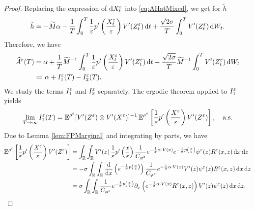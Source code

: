\documentclass[10pt]{article}
\begin{document}
\begin{proof} Replacing the expression of $\mathrm{d} X^\varepsilon_t$ into \eqref{eq:AHatMixed}, we get for $\widetilde h$
\begin{equation}\label{Ahat_decomposition}
\widetilde h = -\widetilde M \alpha - \frac{1}{T} \int_0^T \frac{1}{\varepsilon} p' \left ( \frac{X^\varepsilon_t}{\varepsilon} \right ) V'(Z^\varepsilon_t) \,\mathrm{d} t + \frac{\sqrt{2\sigma}}{T} \int_0^T V'(Z^\varepsilon_t) \,\mathrm{d} W_t.
\end{equation}
Therefore, we have
\begin{equation}
\begin{aligned}
	\widehat A^\varepsilon(T) &= \alpha + \frac{1}{T} \widetilde M^{-1} \int_0^T \frac{1}{\varepsilon} p' \left ( \frac{X^\varepsilon_t}{\varepsilon} \right ) V'(Z^\varepsilon_t) \,\mathrm{d} t - \frac{\sqrt{2\sigma}}{T}  \widetilde M^{-1} \int_0^T V'(Z^\varepsilon_t) \,\mathrm{d} W_t\\
	&\eqqcolon \alpha + I_1^\varepsilon(T) - I_2^\varepsilon(T).
\end{aligned}
\end{equation}
We study the terms $I_1^\varepsilon$ and $I_2^\varepsilon$ separately. The ergodic theorem applied to $I_1^\varepsilon$ yields
\begin{equation}\label{limit_estimator}
\lim_{T \to \infty} I_1^\varepsilon(T) = \operatorname{\mathbb{E}}^{\rho^\varepsilon} [V'(Z^\varepsilon) \otimes V'(X^\varepsilon)]^{-1} \operatorname{\mathbb{E}}^{\rho^\varepsilon} \left [ \frac{1}{\varepsilon} p' \left ( \frac{X^\varepsilon}{\varepsilon} \right ) V'(Z^\varepsilon) \right ], \quad \text{a.s.}
\end{equation}
Due to Lemma \ref{lem:FPMarginal} and integrating by parts, we have
\begin{equation}
\begin{aligned}
	\operatorname{\mathbb{E}}^{\rho^\varepsilon} \left [ \frac{1}{\varepsilon} p' \left ( \frac{X^\varepsilon}{\varepsilon} \right ) V'(Z^\varepsilon) \right ] &= \int_{\mathbb{R}} \int_{\mathbb{R}} V'(z) \, \frac1{\varepsilon} p' \left ( \frac{x}{\varepsilon} \right ) \frac{1}{C_{\varphi^\varepsilon}} e^{- \frac{1}{\sigma} \alpha \cdot V(x)} e^{ - \frac{1}{\sigma} p \left ( \frac{x}{\varepsilon} \right)} \psi^\varepsilon(z) R^\varepsilon(x,z) \,\mathrm{d} x \,\mathrm{d} z \\
	&= -\sigma \int_{\mathbb{R}} \int_{\mathbb{R}} \frac{\mathrm{d}}{\mathrm{d} x}\left( e^{ - \frac{1}{\sigma} p \left ( \frac{x}{\varepsilon} \right)} \right) \frac{1}{C_{\varphi^\varepsilon}} e^{- \frac{1}{\sigma} \alpha \cdot V(x)} V'(z) \psi^\varepsilon(z) R^\varepsilon(x,z) \,\mathrm{d} x \,\mathrm{d} z \\
	&= \sigma \int_{\mathbb{R}} \int_{\mathbb{R}} \frac{1}{C_{\varphi^\varepsilon}} e^{ - \frac{1}{\sigma} p \left ( \frac{x}{\varepsilon} \right)} \partial_x \left ( e^{- \frac{1}{\sigma} \alpha \cdot V(x)} R^\varepsilon(x,z) \right ) V'(z) \psi^\varepsilon(z) \,\mathrm{d} x \,\mathrm{d} z,
\end{aligned}
\end{equation}

\end{proof}
\end{document}
